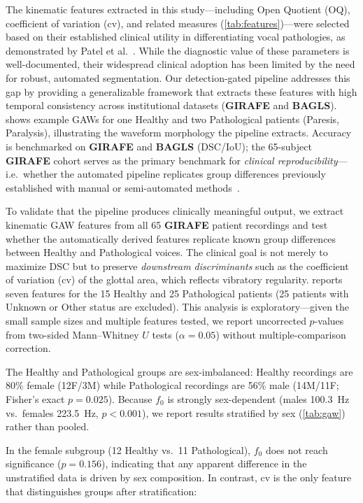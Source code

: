 \documentclass[preprint,12pt]{elsarticle}
\newcommand{\girafe}{\textbf{GIRAFE}}
\newcommand{\bagls}{\textbf{BAGLS}}
\newcommand{\gaw}{GAW}
\begin{document}
The kinematic features extracted in this study---including Open Quotient
(OQ), coefficient of variation (cv), and related measures (\cref{tab:features})---were
selected based on their established clinical utility in differentiating
vocal pathologies, as demonstrated by Patel et al.~\cite{patel2015kinematic}.
While the diagnostic value of these parameters is well-documented, their
widespread clinical adoption has been limited by the need for robust,
automated segmentation.
Our detection-gated pipeline addresses this gap by providing a
generalizable framework that extracts these features with high
temporal consistency across institutional datasets (\girafe{} and \bagls{}).
 shows example \gaw{}s for one Healthy and two
Pathological patients (Paresis, Paralysis), illustrating the waveform
morphology the pipeline extracts.
Accuracy is benchmarked on \girafe{} and \bagls{} (DSC\slash IoU); the
\num{65}-subject \girafe{} cohort serves as the primary benchmark for
\emph{clinical reproducibility}---i.e.\ whether the automated pipeline
replicates group differences previously established with manual or
semi-automated methods~\cite{patel2015kinematic,patel2016nodules}.

To validate that the pipeline produces clinically meaningful output, we
extract kinematic \gaw{} features from all \num{65} \girafe{} patient
recordings and test whether the automatically derived features replicate
known group differences between Healthy and Pathological voices.
The clinical goal is not merely to maximize DSC but to preserve
\emph{downstream discriminants} such as the coefficient of variation (cv)
of the glottal area, which reflects vibratory regularity.
 reports seven features for the \num{15} Healthy and
\num{25} Pathological patients (\num{25} patients with Unknown or Other status are
excluded).
This analysis is exploratory---given the small sample sizes and multiple
features tested, we report uncorrected $p$-values from two-sided
Mann--Whitney $U$ tests ($\alpha = 0.05$) without multiple-comparison
correction.

The Healthy and Pathological groups are sex-imbalanced: Healthy
recordings are \num{80}\% female (\num{12}F/\num{3}M) while Pathological
recordings are \num{56}\% male (\num{14}M/\num{11}F; Fisher's exact
$p{=}0.025$).
Because $f_0$ is strongly sex-dependent (males \SI{100.3}{Hz} vs.\
females \SI{223.5}{Hz}, $p{<}0.001$), we report results stratified by
sex (\cref{tab:gaw}) rather than pooled.

In the female subgroup (\num{12} Healthy vs.\ \num{11} Pathological),
$f_0$ does not reach significance ($p{=}0.156$), indicating that any
apparent difference in the unstratified data is driven by sex composition.
In contrast, cv is the only feature that distinguishes groups after
stratification:
\end{document}

